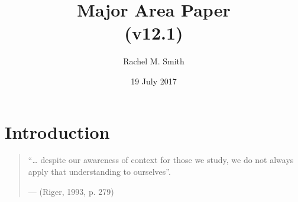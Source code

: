 \documentclass[11pt,]{tufte-book}
\title{Major Area Paper\\
(v12.1)}
\author{Rachel M. Smith}
\date{19 July 2017}
\begin{document}
\maketitle



{
\setcounter{tocdepth}{1}
\tableofcontents
}

\makeatletter
\def\LT@makenoprefixcaption#1#2#3{%
  \LT@mcol\LT@cols c{\hbox to\z@{\hss\parbox[t]\LTcapwidth{
    \sbox\@tempboxa{#1{}#3}
    \ifdim\wd\@tempboxa>\hsize
      #1{}#3
    \else
      \hbox to\hsize{\hfil\box\@tempboxa\hfil}%
    \fi
    \endgraf\vskip\baselineskip}
  \hss}}}
\makeatother

\makeatletter
\let\LT@oldmakecaption=\LT@makecaption
\let\oldthetable=\thetable
\let\oldtheHtable=\theHtable
\makeatother

\makeatletter
{}
\newenvironment{no-prefix-table-caption}{
  \let\LT@makecaption=\LT@makenoprefixcaption
  \renewcommand\thetable{x.\thetableno}
  \renewcommand\theHtable{x.\thetableno}
  \stepcounter{tableno}
}{
  \let\thetable=\oldthetable
  \let\theHtable=\oldtheHtable
  \let\LT@makecaption=\LT@oldmakecaption
  \addtocounter{table}{-1}
}
\makeatother

\newcommand{\plusnamesingular}{}
\newcommand{\starnamesingular}{}
\newcommand{\xrefname}[1]{\protect\renewcommand{\plusnamesingular}{#1}}
\newcommand{\Xrefname}[1]{\protect\renewcommand{\starnamesingular}{#1}}
\providecommand{\cref}{\plusnamesingular~\ref}
\providecommand{\Cref}{\starnamesingular~\ref}
\providecommand{\crefformat}[2]{}
\providecommand{\Crefformat}[2]{}

\crefformat{figure}{Figure~#2#1#3}
\Crefformat{figure}{Figure~#2#1#3}
\crefformat{table}{Table~#2#1#3}
\Crefformat{table}{Table~#2#1#3}

\part{Introduction}

\begin{quote}
``\ldots{} despite our awareness of context for those we study, we do
not always apply that understanding to ourselves''.

\hfill --- (Riger, 1993, p. 279)
\end{quote}
\end{document}
